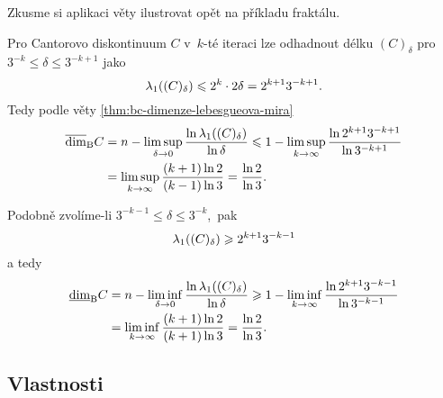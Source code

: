 Zkusme si aplikaci věty ilustrovat opět na příkladu fraktálu.
\begin{example}
    Pro Cantorovo diskontinuum $C$ v~$k$-té iteraci lze odhadnout délku $(C)_\delta$ pro $3^{-k}\leqslant\delta\leqslant 3^{-k+1}$ jako
    \[\lambda_1((C)_\delta)\leqslant2^k\cdot 2\delta=2^{k+1}3^{-k+1}.\]
    Tedy podle věty \ref{thm:bc-dimenze-lebesgueova-mira}
    \begin{align*}
        \overline{\dim}_\textup{B}{C}&=n-\limsup_{\delta\to 0}\dfrac{\ln{\ensuremath{\lambda_1}((C)_\delta)}}{\ln{\delta}}\leqslant1-\limsup_{k\to\infty}\dfrac{\ln{2^{k+1}3^{-k+1}}}{\ln{3^{-k+1}}}\\
        &=\limsup_{k\to\infty}\dfrac{(k+1)\ln{2}}{(k-1)\ln{3}}=\dfrac{\ln{2}}{\ln{3}}.
    \end{align*}

    Podobně zvolíme-li $3^{-k-1}\leqslant\delta\leqslant 3^{-k}$,~pak
    \[\lambda_1((C)_\delta)\geqslant 2^{k+1}3^{-k-1}\]
    a tedy
    \begin{align*}
        \underline{\dim}_\textup{B}{C}&=n-\liminf_{\delta\to 0}\dfrac{\ln{\ensuremath{\lambda_1}((C)_\delta)}}{\ln{\delta}}\geqslant 1-\liminf_{k\to\infty}\dfrac{\ln{2^{k+1}3^{-k-1}}}{\ln{3^{-k-1}}}\\
        &=\liminf_{k\to\infty}\dfrac{(k+1)\ln{2}}{(k+1)\ln{3}}=\dfrac{\ln{2}}{\ln{3}}.
    \end{align*}
\end{example}

\subsection{Vlastnosti}\label{subsec:vlastnosti-bc-dimenze}

